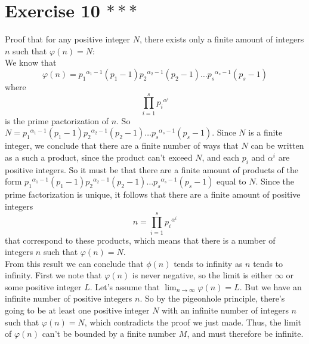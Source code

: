 \documentclass[12pt]{article}
\begin{document}
    \section*{Exercise 10 $***$}
    Proof that for any positive integer $N$,
    there exists only a finite amount of integers $n$
    such that $\varphi(n) = N$: \\
    We know that 
    \[ \varphi(n)
    = {p_1}^{\alpha_1 - 1}(p_1 - 1){p_2}^{\alpha_2 - 1}(p_2 - 1)
    \dots {p_s}^{\alpha_s - 1}(p_s - 1) \]
    where 
    \[ \prod_{i=1}^s {p_i}^{\alpha^i} \]
    is the prime pactorization of $n$.
    So $N = {p_1}^{\alpha_1 - 1}(p_1 - 1){p_2}^{\alpha_2 - 1}(p_2 - 1)
    \dots {p_s}^{\alpha_s - 1}(p_s - 1)$.
    Since $N$ is a finite integer,
    we conclude that there are a finite number of ways that
    $N$ can be written as 
    a such a product,
    since the product can't exceed $N$,
    and each $p_i$ and $\alpha^i$ are positive integers.
    So it must be that there are a
    finite amount of products
    of the form ${p_1}^{\alpha_1 - 1}(p_1 - 1){p_2}^{\alpha_2 - 1}(p_2 - 1)
    \dots {p_s}^{\alpha_s - 1}(p_s - 1)$
    equal to $N$.
    Since the prime factorization is unique,
    it follows that there are a finite amount of positive integers
    \[ n  = \prod_{i=1}^s {p_i}^{\alpha^i} \]
    that correspond to these products,
    which means that there is a number of integers $n$
    such that $\varphi(n) = N$. \\
    From this result we can conclude
    that $\phi(n)$ tends to infinity
    as $n$ tends to infinity.
    First we note that $\varphi(n)$ is never negative,
    so the limit is either $\infty$ or some positive integer $L$.
    Let's assume that $\lim_{n \to \infty} \varphi(n) = L$.
    But we have an infinite number of positive integers $n$.
    So by the pigeonhole principle,
    there's going to be at least one positive integer $N$
    with an infinite number of integers $n$
    such that $\varphi(n) = N$,
    which contradicts the proof we just made.
    Thus, the limit of $\varphi(n)$
    can't be bounded by a finite number $M$,
    and must therefore be infinite. \\
\end{document}
